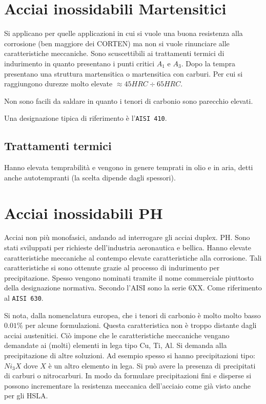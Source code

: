 \section{Acciai inossidabili Martensitici}
Si applicano per quelle applicazioni in cui si vuole una buona resistenza
alla corrosione (ben maggiore dei CORTEN) ma non si vuole rinunciare
alle caratteristiche meccaniche.
Sono scuscettibili ai trattamenti termici di indurimento in quanto presentano 
i punti critici $A_1$ e $A_3$. 
Dopo la tempra presentano una struttura martensitica o martensitica con 
carburi. Per cui si raggiungono durezze molto elevate $\approx 45\unit{HRC}
\div 65\unit{HRC}$.

Non sono facili da saldare in quanto i tenori di carbonio sono parecchio 
elevati.

Una designazione tipica di riferimento è l'\texttt{AISI 410}.

\subsection{Trattamenti termici}

Hanno elevata temprabilità e vengono in genere temprati in olio e in aria, 
detti anche autotempranti (la scelta dipende dagli spessori).

\section{Acciai inossidabili PH}

Acciai non più monofasici, andando ad interrogare gli acciai duplex.
\ac{PH}. 
Sono stati sviluppati per richieste dell'industria aeronautica e bellica.
Hanno elevate caratteristiche meccaniche al contempo elevate caratteristiche
alla corrosione.
Tali caratteristiche si sono ottenute grazie al processo di indurimento per
precipitazione.
Spesso vengono nominati tramite il nome commerciale piuttosto della
designazione normativa.
Secondo l'\ac{AISI} sono la serie 6XX. Come riferimento al
\texttt{AISI 630}.

Si nota, dalla nomenclatura europea, che i tenori di carbonio è molto
molto basso $0.01\%$ per alcune formulazioni.
Questa caratteristica non è troppo distante dagli acciai austenitici.
Ciò impone che le caratteristiche meccaniche vengano demandate ai (molti)
elementi in lega tipo Cu, Ti, Al. Si demanda alla precipitazione di altre 
soluzioni.
Ad esempio spesso si hanno precipitazioni tipo: $Ni_3X$ dove $X$ è un
altro elemento in lega.
Si può avere la presenza di precipitati di carburi o nitrocarburi. In modo da formulare precipitazioni fini e disperse si possono incrementare la resistenza meccanica dell'acciaio come già visto anche per gli \ac{HSLA}.

